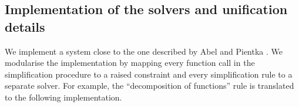 \begin{imageonly}
\begin{Shaded}
\begin{Highlighting}[]
\NormalTok{ (} \OperatorTok{:\textless{}:}
                \OtherTok{=\textgreater{}} 
\OtherTok{=}
  \OtherTok{=}
\OtherTok{=}
\OtherTok{=}
\OtherTok{=}\NormalTok{ []}
\OtherTok{=}\NormalTok{ [leftMetaSymbol]}
\NormalTok{         \}}
\end{Highlighting}
\end{Shaded}
\end{imageonly}

\hypertarget{sec:solvers-implementation}{%
\subsection{Implementation of the solvers and unification
details}\label{sec:solvers-implementation}}

We implement a system close to the one described by
Abel and Pientka \cite{abelHigherOrderDynamicPattern2011}. We modularise the
implementation by mapping every function call in the simplification
procedure to a raised constraint and every simplification rule to a
separate solver. For example, the ``decomposition of functions''
\citep[fig.~2]{abelHigherOrderDynamicPattern2011} rule is translated to
the following implementation.


\begin{imageonly}
\begin{Shaded}
\begin{Highlighting}[]
\NormalTok{ (} \OperatorTok{:\textless{}:}
                       \OtherTok{=\textgreater{}} 
\OtherTok{=} 
  \OtherTok{=}
    \NormalTok{ (}\OtherTok{{-}\textgreater{}}
\NormalTok{        (}\NormalTok{ \_ \_ \_, }\NormalTok{ \_ \_ \_) }\OtherTok{{-}\textgreater{}}  
\NormalTok{        \_ }\OtherTok{{-}\textgreater{}}  
\NormalTok{    \_ }\OtherTok{{-}\textgreater{}}  
\end{Highlighting}
\end{Shaded}
\end{imageonly}

